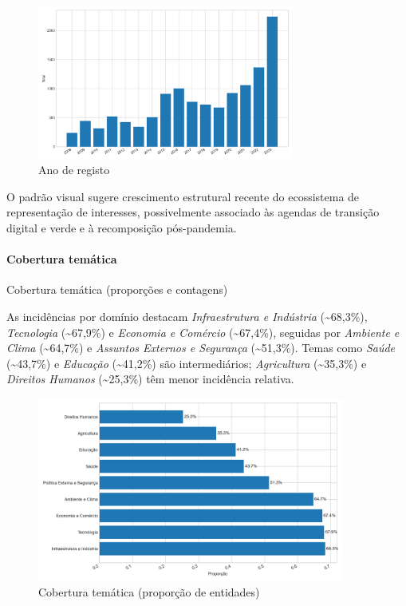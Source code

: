 \begin{figure}[!htbp]
\centering
\includegraphics[width=0.75\textwidth]{figures/year_distribution.png}
\caption{Ano de registo}
\end{figure}

O padrão visual sugere crescimento estrutural recente do ecossistema de representação de interesses, possivelmente associado às agendas de transição digital e verde e à recomposição pós-pandemia.

\paragraph{Cobertura temática}
\begin{table}[!htbp]
\centering
\caption{Cobertura temática (proporções e contagens)}

\end{table}

As incidências por domínio destacam \textit{Infraestrutura e Indústria} (\textasciitilde68,3\%), \textit{Tecnologia} (\textasciitilde67,9\%) e \textit{Economia e Comércio} (\textasciitilde67,4\%), seguidas por \textit{Ambiente e Clima} (\textasciitilde64,7\%) e \textit{Assuntos Externos e Segurança} (\textasciitilde51,3\%). Temas como \textit{Saúde} (\textasciitilde43,7\%) e \textit{Educação} (\textasciitilde41,2\%) são intermediários; \textit{Agricultura} (\textasciitilde35,3\%) e \textit{Direitos Humanos} (\textasciitilde25,3\%) têm menor incidência relativa.

\begin{figure}[!htbp]
\centering
\includegraphics[width=0.9\textwidth]{figures/theme_coverage.png}
\caption{Cobertura temática (proporção de entidades)}
\end{figure}

